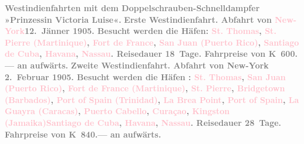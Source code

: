 \documentclass[twoside=false,titlepage=false,open=any, parskip=never, fontsize=12pt, headings=small, chapterprefix=false, appendixprefix=false]{scrbook}
\begin{document}
           {\bigskip}\pstart
           \noindent{}\centering{}\textcolor{gray}{\textbf{Westindienfahrten mit dem Doppelschrauben-Schnelldampfer
                  »Prinzessin Victoria Luise«.}}\pend
           \pstart
           \noindent{}\textcolor{gray}{\textbf{\textbf{Erste Westindienfahrt.} Abfahrt von \textcolor{pink}{New-York}{}\ledrightnote{\textcolor{pink}{New York City}}{ }\textbf{12. Jänner 1905}. Besucht werden die Häfen: \textcolor{pink}{St. Thomas}{}\ledrightnote{\textcolor{pink}{Saint Thomas}},
                     \textcolor{pink}{St. Pierre (Martinique)}{}\ledrightnote{\textcolor{pink}{Saint-Pierre}}, \textcolor{pink}{Fort de France}{}\ledrightnote{\textcolor{pink}{Fort-de-France}}, \textcolor{pink}{San Juan
                     (Puerto Rico)}{}\ledrightnote{\textcolor{pink}{San Juan}}, \textcolor{pink}{Santiago de Cuba}{}\ledrightnote{\textcolor{pink}{Santiago de Cuba}}, \textcolor{pink}{Havana}{}\ledrightnote{\textcolor{pink}{Havana}}, \textcolor{pink}{Nassau}{}\ledrightnote{\textcolor{pink}{Nassau}}. Reisedauer 18 Tage. Fahrpreise von \textbf{K 600.—}
                  an aufwärts.}}\pend
           \pstart
           \textcolor{gray}{\textbf{\textbf{Zweite Westindienfahrt.} Abfahrt von New-York { }\textbf{2. Februar 1905}. Besucht werden die Häfen : \textcolor{pink}{St. Thomas}{}\ledrightnote{\textcolor{pink}{Saint Thomas}},
                     \textcolor{pink}{San Juan (Puerto Rico)}{}\ledrightnote{\textcolor{pink}{San Juan}}, \textcolor{pink}{Fort de France (Martinique)}{}\ledrightnote{\textcolor{pink}{Fort-de-France}}, \textcolor{pink}{St. Pierre}{}\ledrightnote{\textcolor{pink}{Saint-Pierre}}, \textcolor{pink}{Bridgetown (Barbados)}{}\ledrightnote{\textcolor{pink}{Bridgetown}}, \textcolor{pink}{Port of Spain (Trinidad)}{}\ledrightnote{\textcolor{pink}{Port of Spain}}, \textcolor{pink}{La Brea Point}{}\ledrightnote{\textcolor{pink}{Punta Brea}}, \textcolor{pink}{Port of
                     Spain}{}\ledrightnote{\textcolor{pink}{Port of Spain}}, \textcolor{pink}{La Guayra (Caracas)}{}\ledrightnote{\textcolor{pink}{La Guaira}}, \textcolor{pink}{Puerto Cabello}{}\ledrightnote{\textcolor{pink}{Puerto Cabello}}, \textcolor{pink}{Curaçao}{}\ledrightnote{\textcolor{pink}{Curaçao}}, \textcolor{pink}{Kingston (Jamaika)}{}\ledrightnote{\textcolor{pink}{Kingston}}\textcolor{pink}{Santiago de Cuba}{}\ledrightnote{\textcolor{pink}{Santiago de Cuba}}, \textcolor{pink}{Havana}{}\ledrightnote{\textcolor{pink}{Havana}}, \textcolor{pink}{Nassau}{}\ledrightnote{\textcolor{pink}{Nassau}}. Reisedauer 28 Tage.
                  Fahrpreise von \textbf{K 840.—} an aufwärts.}}\pend
\end{document}
